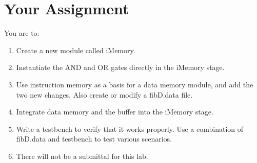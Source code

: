 \section{Your Assignment}

You are to:
\begin{enumerate}
\item Create a new module called iMemory.
\item Instantiate the AND and OR gates directly in the iMemory stage.
\item Use instruction memory as a basis for a data memory module, and add the two new changes.  Also create or modify a fibD.data file.
\item Integrate data memory and the buffer into the iMemory stage.  
\item Write a testbench to verify that it works properly. Use a combination of fibD.data and testbench to test various scenarios.
\item There will not be a submittal for this lab.
\end{enumerate} 